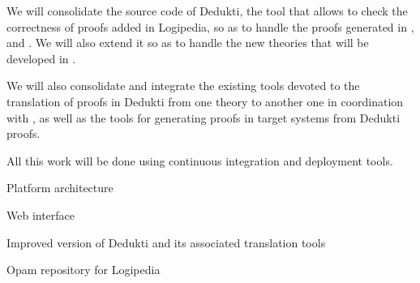 \begin{workpackage}[id=access,type=RTD,wphases=1-48,
  short=Access,%
  title={Access},
  lead=Inr,InrRM=54,OcaRM=6]
\begin{tasklist}
  \begin{task}[id=dedukti,
      title=Development and maintenance of Dedukti tools,
      shorttitle=Dev.,
      lead=Inr,InrRM=18,wphases=19-36] We will consolidate the source
    code of Dedukti, the tool that allows to check the correctness of
    proofs added in Logipedia, so as to handle the proofs generated in
    ,  and . We
    will also extend it so as to handle the new theories that will be
    developed in .

    We will also consolidate and integrate the existing tools devoted
    to the translation of proofs in Dedukti from one theory to another
    one in coordination with , as well as the tools
    for generating proofs in target systems from Dedukti proofs.
    
    All this work will be done using continuous integration and
    deployment tools.
  \end{task}
  
\end{tasklist}


\begin{wpdelivs}

  
  \begin{wpdeliv}[due=6,id=archi,dissem=PU,nature=OTHER,lead=Inr,task=archi]{Platform architecture}\end{wpdeliv}

  \begin{wpdeliv}[due=18,id=web,dissem=PU,nature=DEC,lead=Inr,task=web]{Web interface}\end{wpdeliv}

  \begin{wpdeliv}[due=24,id=dedukti,dissem=PU,nature=OTHER,lead=Inr,task=dedukti]{Improved version of Dedukti and its associated translation tools}\end{wpdeliv}

  
  \begin{wpdeliv}[due=18,id=opam,dissem=PU,nature=OTHER,lead=Oca,task=opam,miles=opam]{Opam repository for Logipedia}\end{wpdeliv}


\end{wpdelivs}
\end{workpackage}
